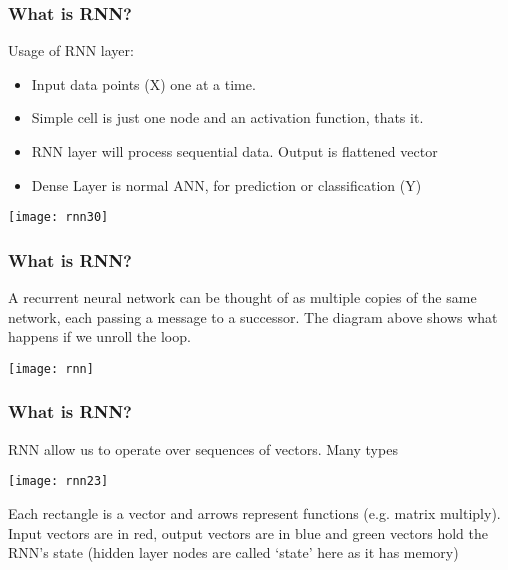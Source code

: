 \begin{frame}[fragile] \frametitle{What is RNN?}
Usage of RNN layer:
\begin{itemize}
\item Input data points (X) one at a time.
\item Simple cell is just one node and an activation function, thats it.
\item RNN layer will process sequential data. Output is flattened vector
\item Dense Layer is normal ANN, for prediction or classification (Y)
\end{itemize}


\begin{center}
\texttt{[image: rnn30]}
\end{center}
\end{frame}

\begin{frame}[fragile] \frametitle{What is RNN?}

A recurrent neural network can be thought of as multiple copies of the same network, each passing a message to a successor. 
The diagram above shows what happens if we unroll the loop. 

\begin{center}
\texttt{[image: rnn]}
\end{center}
\end{frame}


\begin{frame}[fragile] \frametitle{What is RNN?}

RNN allow us to operate over sequences of vectors. Many types
\begin{center}
\texttt{[image: rnn23]}
\end{center}
Each rectangle is a vector and arrows represent functions (e.g. matrix multiply). Input vectors are in red, output vectors are in blue and green vectors hold the RNN's state (hidden layer nodes are called `state' here as it has memory)

\end{frame}

